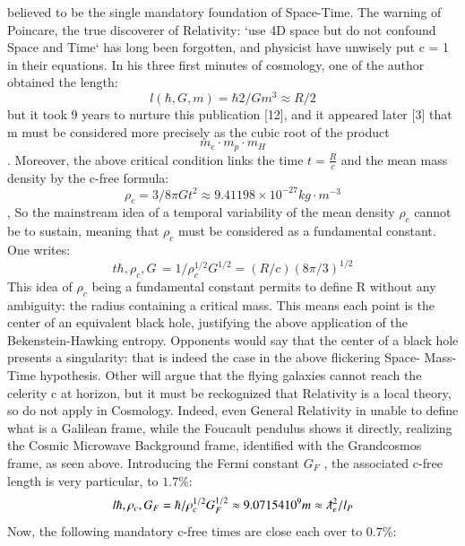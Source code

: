\documentclass[twoside,draft]{article}
\begin{document}
{believed to be the single mandatory foundation of Space-Time. The warning of Poincare, the true
discoverer of Relativity: `use 4D space but do not confound Space and Time` has long been
forgotten, and physicist have unwisely put c = 1 in their equations.
In his three first minutes of cosmology, one of the author obtained the length:
\begin{equation}
l (\hbar,G,m) = \hbar 2 /Gm^{3} \approx R/2
\end{equation}
but it took 9 years to nurture this publication [12], and it appeared later [3] that m must be considered more precisely as the cubic root of the product 
\begin{equation}
m_{e} \cdot m_{p} \cdot m_{H}
\end{equation}. Moreover, the above critical condition
links the time $t = \frac{R}{c}$ and the mean mass density by the c-free formula:
\begin{equation}
\rho_{c} = 3/8\pi Gt^{2} \approx 9.41198 \times 10^{-27} kg \cdot m^{-3}
\end{equation}
, So the mainstream idea of a temporal variability of the mean density $\rho_{c}$ cannot be to
sustain, meaning that $\rho_{c}$ must be considered as a fundamental constant. One writes:
\begin{equation}
t{\hbar,\rho_{c} ,G}\, = 1/\rho_{c}^{1/2} G^{1/2} = (R/c) (8\pi/3)^{1/2}
\end{equation}
This idea of $\rho_{c}$ being a fundamental constant permits to define R without any ambiguity: the
radius containing a critical mass. This means each point is the center of an equivalent black hole,
justifying the above application of the Bekenstein-Hawking entropy. Opponents would say that the
center of a black hole presents a singularity: that is indeed the case in the above flickering Space-
Mass-Time hypothesis. Other will argue that the flying galaxies cannot reach the celerity c at
horizon, but it must be reckognized that Relativity is a local theory, so do not apply in Cosmology.
Indeed, even General Relativity in unable to define what is a Galilean frame, while the Foucault
pendulus shows it directly, realizing the Cosmic Microwave Background frame, identified with the
Grandcosmos frame, as seen above.
Introducing the Fermi constant $G_{F}$ , the associated c-free length is very particular, to $1.7\%$:
$$l{\hbar,\rho_{c},G_{F}} = \hbar/\rho_{c}^{1/2} G_{F}^{1/2} \approx 9.07154 10^{9} m \approx \lambdabar_{e}^{2}/l_{P}$$
Now, the following mandatory c-free times are close each over to $0.7\%$:
\begin{equation}

\end{equation}}
\end{document}
